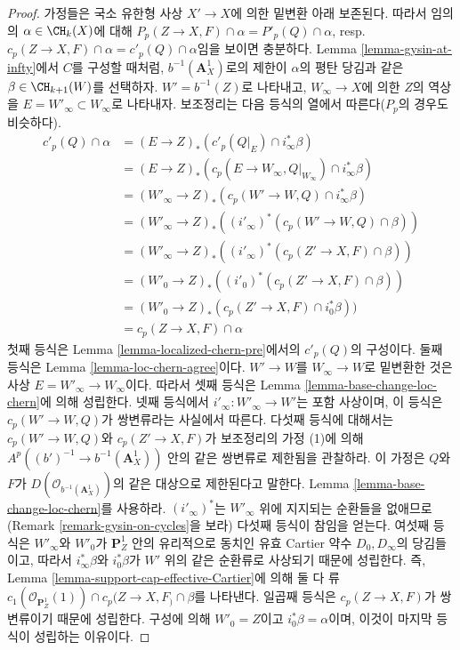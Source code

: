 \begin{proof}
가정들은 국소 유한형 사상 $X' \to X$에 의한 밑변환 아래 보존된다.
따라서 임의의 $\alpha \in \CH_k(X)$에 대해
$P_p(Z \to X, F) \cap \alpha = P'_p(Q) \cap \alpha$,
resp.\ $c_p(Z \to X, F) \cap \alpha = c'_p(Q) \cap \alpha$임을 보이면
충분하다. Lemma \ref{lemma-gysin-at-infty}에서 $C$를 구성할 때처럼,
$b^{-1}(\mathbf{A}^1_X)$로의 제한이 $\alpha$의 평탄 당김과 같은
$\beta \in \CH_{k + 1}(W)$를 선택하자. $W' = b^{-1}(Z)$로 나타내고,
$W_\infty \to X$에 의한 $Z$의 역상을
$E = W'_\infty \subset W_\infty$로 나타내자. 보조정리는 다음 등식의
열에서 따른다($P_p$의 경우도 비슷하다).
\begin{align*}
c'_p(Q) \cap \alpha
& =
(E \to Z)_*(c'_p(Q|_E) \cap i_\infty^*\beta) \\
& =
(E \to Z)_*(c_p(E \to W_\infty, Q|_{W_\infty}) \cap i_\infty^*\beta) \\
& =
(W'_\infty \to Z)_*(c_p(W' \to W, Q) \cap i_\infty^*\beta) \\
& =
(W'_\infty \to Z)_*((i'_\infty)^*(c_p(W' \to W, Q) \cap \beta)) \\
& =
(W'_\infty \to Z)_*((i'_\infty)^*(c_p(Z' \to X, F) \cap \beta)) \\
& =
(W'_0 \to Z)_*((i'_0)^*(c_p(Z' \to X, F) \cap \beta)) \\
& =
(W'_0 \to Z)_*(c_p(Z' \to X, F) \cap i_0^*\beta)) \\
& =
c_p(Z \to X, F) \cap \alpha
\end{align*}
첫째 등식은 Lemma \ref{lemma-localized-chern-pre}에서의 $c'_p(Q)$의
구성이다. 둘째 등식은 Lemma \ref{lemma-loc-chern-agree}이다.
$W' \to W$를 $W_\infty \to W$로 밑변환한 것은 사상
$E = W'_\infty \to W_\infty$이다. 따라서 셋째 등식은 Lemma
\ref{lemma-base-change-loc-chern}에 의해 성립한다. 넷째 등식에서
$i'_\infty : W'_\infty \to W'$는 포함 사상이며, 이 등식은
$c_p(W' \to W, Q)$가 쌍변류라는 사실에서 따른다. 다섯째 등식에
대해서는 $c_p(W' \to W, Q)$와 $c_p(Z' \to X, F)$가 보조정리의 가정
(1)에 의해 $A^p((b')^{-1} \to b^{-1}(\mathbf{A}^1_X))$ 안의 같은
쌍변류로 제한됨을 관찰하라. 이 가정은 $Q$와 $F$가
$D(\mathcal{O}_{b^{-1}(\mathbf{A}^1_X)})$의 같은 대상으로 제한된다고
말한다. Lemma \ref{lemma-base-change-loc-chern}를 사용하라.
$(i'_\infty)^*$는 $W'_\infty$ 위에 지지되는 순환들을 없애므로
(Remark \ref{remark-gysin-on-cycles}을 보라) 다섯째 등식이 참임을
얻는다. 여섯째 등식은 $W'_\infty$와 $W'_0$가
$\mathbf{P}^1_Z$ 안의 유리적으로 동치인 유효 Cartier 약수
$D_0, D_\infty$의 당김들이고, 따라서 $i_\infty^*\beta$와
$i_0^*\beta$가 $W'$ 위의 같은 순환류로 사상되기 때문에 성립한다.
즉, Lemma \ref{lemma-support-cap-effective-Cartier}에 의해 둘 다 류
$c_1(\mathcal{O}_{\mathbf{P}^1_Z}(1)) \cap c_p(Z \to X, F_) \cap \beta$를
나타낸다. 일곱째 등식은 $c_p(Z \to X, F)$가 쌍변류이기 때문에
성립한다. 구성에 의해 $W'_0 = Z$이고 $i_0^*\beta = \alpha$이며, 이것이
마지막 등식이 성립하는 이유이다.
\end{proof}







